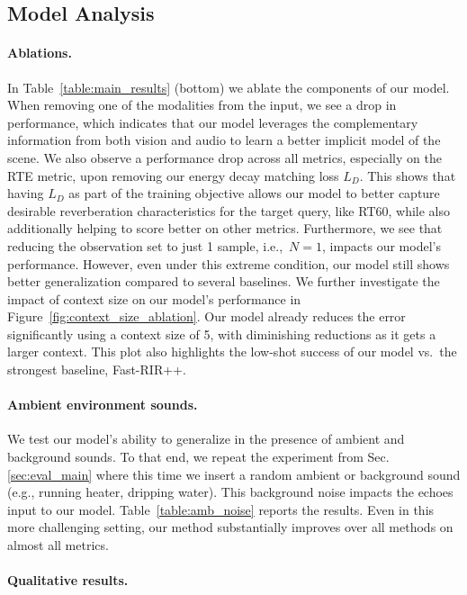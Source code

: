 \subsection{Model Analysis}\label{sec:eval_model_analysis}
\paragraph{Ablations.} In Table~\ref{table:main_results} (bottom) we ablate the components of our model. When removing one of the modalities from the input, we see a drop in performance,  which indicates that our model leverages the complementary information from both vision and audio to learn a better implicit model of the scene. We also observe a performance drop across all metrics, especially on the RTE metric, upon removing our energy decay matching loss $L_D$. This shows that having $L_D$ as part of the training objective allows our model to better capture desirable reverberation characteristics for the target query, like RT60, while also additionally helping to score better on other metrics. Furthermore, we see that reducing the observation set to just 1 sample, \mbox{i.e.,~}$N=1$, impacts our model's performance. However, even under this extreme condition, our model still shows better generalization compared to several baselines. We further investigate the impact of context size on our model's performance in Figure~\ref{fig:context_size_ablation}. Our model already reduces the error significantly using a context size of 5, with diminishing reductions as it gets a larger context. This plot also highlights the low-shot success of our model vs.~the strongest baseline, Fast-RIR++.

\paragraph{Ambient environment sounds.} We test our model's ability to generalize in the presence of ambient and background sounds. To that end, we repeat the experiment from Sec.\ref{sec:eval_main} where this time we insert a random ambient or background sound (e.g., running heater, dripping water). This background noise impacts the echoes input to our model.
Table~\ref{table:amb_noise} reports the results.  Even in this more challenging setting, our method substantially improves over all methods on almost all metrics.

\paragraph{Qualitative results.}

